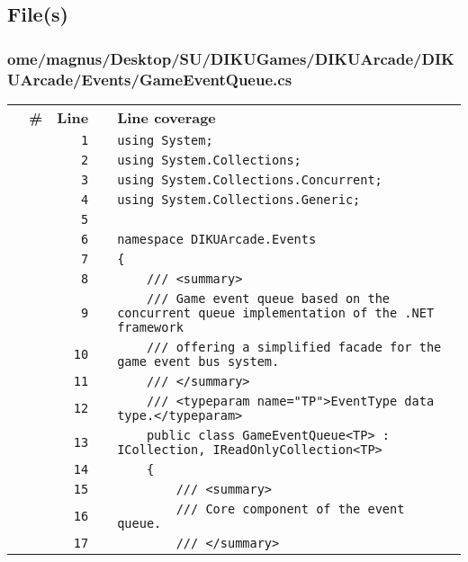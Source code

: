 \documentclass[a4paper,landscape,10pt]{article}
\begin{document}
\subsection{File(s)}
\subsubsection{ome/magnus/Desktop/SU/DIKUGames/DIKUArcade/DIKUArcade/Events/GameEventQueue.cs}
\begin{longtable}[l]{lrrll}
\textbf{} & \textbf{\#} & \textbf{Line} & \textbf{} & \textbf{Line coverage}\\
\cellcolor{gray} &  & \verb~1~ & & \verb~using System;~\\
\cellcolor{gray} &  & \verb~2~ & & \verb~using System.Collections;~\\
\cellcolor{gray} &  & \verb~3~ & & \verb~using System.Collections.Concurrent;~\\
\cellcolor{gray} &  & \verb~4~ & & \verb~using System.Collections.Generic;~\\
\cellcolor{gray} &  & \verb~5~ & & \verb~~\\
\cellcolor{gray} &  & \verb~6~ & & \verb~namespace DIKUArcade.Events~\\
\cellcolor{gray} &  & \verb~7~ & & \verb~{~\\
\cellcolor{gray} &  & \verb~8~ & & \verb~    /// <summary>~\\
\cellcolor{gray} &  & \verb~9~ & & \verb~    /// Game event queue based on the concurrent queue implementation of the .NET framework~\\
\cellcolor{gray} &  & \verb~10~ & & \verb~    /// offering a simplified facade for the game event bus system.~\\
\cellcolor{gray} &  & \verb~11~ & & \verb~    /// </summary>~\\
\cellcolor{gray} &  & \verb~12~ & & \verb~    /// <typeparam name="TP">EventType data type.</typeparam>~\\
\cellcolor{gray} &  & \verb~13~ & & \verb~    public class GameEventQueue<TP> : ICollection, IReadOnlyCollection<TP>~\\
\cellcolor{gray} &  & \verb~14~ & & \verb~    {~\\
\cellcolor{gray} &  & \verb~15~ & & \verb~        /// <summary>~\\
\cellcolor{gray} &  & \verb~16~ & & \verb~        /// Core component of the event queue.~\\
\cellcolor{gray} &  & \verb~17~ & & \verb~        /// </summary>~\\

\end{longtable}
\end{document}
